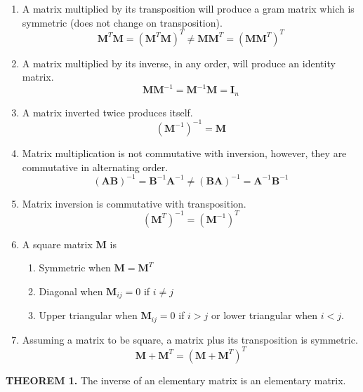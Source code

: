 \documentclass[12pt]{article}
\newcommand{\mat}[1]{\mathbf{#1}}
\newcommand{\theorem}[2]{\textbf{THEOREM #1.} #2}
\begin{document}
\begin{enumerate}
\item A matrix multiplied by its transposition will produce a gram matrix which is symmetric (does not change on transposition).
\begin{equation}
  \mat{M}^T \mat{M} = (\mat{M}^T \mat{M})^T \neq \mat{M} \mat{M}^T = (\mat{M} \mat{M}^T)^T
\end{equation}
\item A matrix multiplied by its inverse, in any order, will produce an identity matrix.
\begin{equation}
  \mat{M} \mat{M}^{-1} = \mat{M}^{-1} \mat{M} = \mat{I}_{n}
\end{equation}
\item A matrix inverted twice produces itself.
\begin{equation}
(\mat{M}^{-1})^{-1} = \mat{M}
\end{equation}
\item Matrix multiplication is not commutative with inversion, however, they are commutative in alternating order.
\begin{equation}
(\mat{AB})^{-1} = \mat{B}^{-1} \mat{A}^{-1} \neq (\mat{BA})^{-1} = \mat{A}^{-1} \mat{B}^{-1}
\end{equation}
\item Matrix inversion is commutative with transposition.
\begin{equation}
(\mat{M}^T)^{-1} = (\mat{M}^{-1})^{T}
\end{equation}
\item A square matrix $\mat{M}$ is
\begin{enumerate}
\item Symmetric when $\mat{M} = \mat{M}^T$
\item Diagonal when $\mat{M}_{ij} = 0$ if $i \neq j$
\item Upper triangular when $\mat{M}_{ij} = 0$ if $i > j$ or lower triangular when $i < j$.
\end{enumerate}
\item Assuming a matrix to be square, a matrix plus its transposition is symmetric.
\begin{equation}
\mat{M} + \mat{M}^T = (\mat{M} + \mat{M}^T)^T
\end{equation}
\end{enumerate}

\theorem{1}{The inverse of an elementary matrix is an elementary matrix.}
\end{document}
